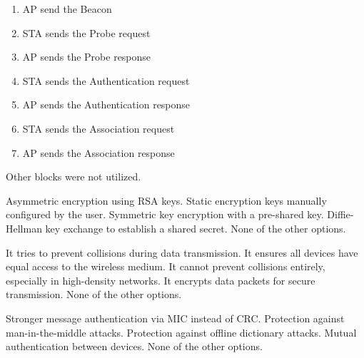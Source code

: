 \begin{questions}
    \begin{solution}
        \begin{enumerate}
            \item AP send the Beacon
            \item STA sends the Probe request
            \item AP sends the Probe response
            \item STA sends the Authentication request
            \item AP sends the Authentication response
            \item STA sends the Association request
            \item AP sends the Association response
        \end{enumerate}
        Other blocks were not utilized.
    \end{solution}

    \begin{checkboxes}
        \choice Asymmetric encryption using RSA keys.
        \choice Static encryption keys manually configured by the user.
        \choice Symmetric key encryption with a pre-shared key.
        \CorrectChoice Diffie-Hellman key exchange to establish a shared secret.
        \choice None of the other options.
    \end{checkboxes}

    \begin{checkboxes}
        \CorrectChoice It tries to prevent collisions during data transmission.
        \CorrectChoice It ensures all devices have equal access to the wireless medium.
        \CorrectChoice It cannot prevent collisions entirely, especially in high-density networks.
        \choice It encrypts data packets for secure transmission.
        \choice None of the other options.
    \end{checkboxes}


    \begin{checkboxes}
        \choice Stronger message authentication via MIC instead of CRC.
        \CorrectChoice Protection against man-in-the-middle attacks.
        \CorrectChoice Protection against offline dictionary attacks.
        \CorrectChoice Mutual authentication between devices.
        \choice None of the other options.
    \end{checkboxes}


\end{questions}
